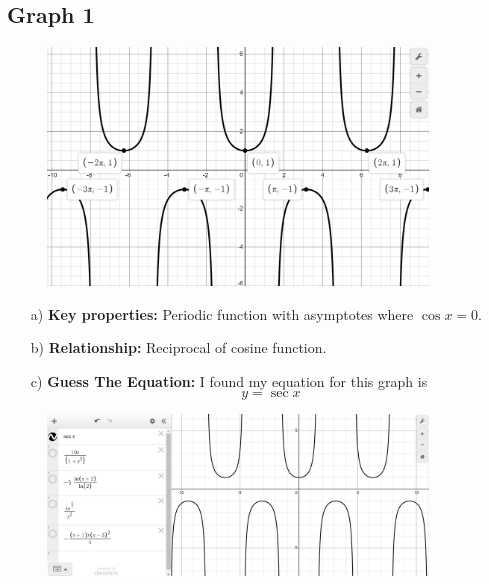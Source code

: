 \documentclass{article}
\begin{document}
\subsection{Graph 1}

\begin{figure}[h]
    \centering
    \includegraphics[width=0.9\textwidth]{imgs/imgs FSE/g_1.png}
    \label{fig:image}
\end{figure}
\begin{enumerate}
    \item[a)] \textbf{Key properties:} Periodic function with asymptotes where $\cos x = 0$. 
    \item[b)]  \textbf{Relationship:} Reciprocal of cosine function.
    \item[c)] \textbf{Guess The Equation: } I found my equation for this graph is $$y=\sec x$$
\end{enumerate}
\begin{figure}[h]
    \centering
    \includegraphics[width=0.9\textwidth]{imgs/imgs FSE/sec_x.png}
    \label{fig:image}
\end{figure}

\newpage
\end{document}
